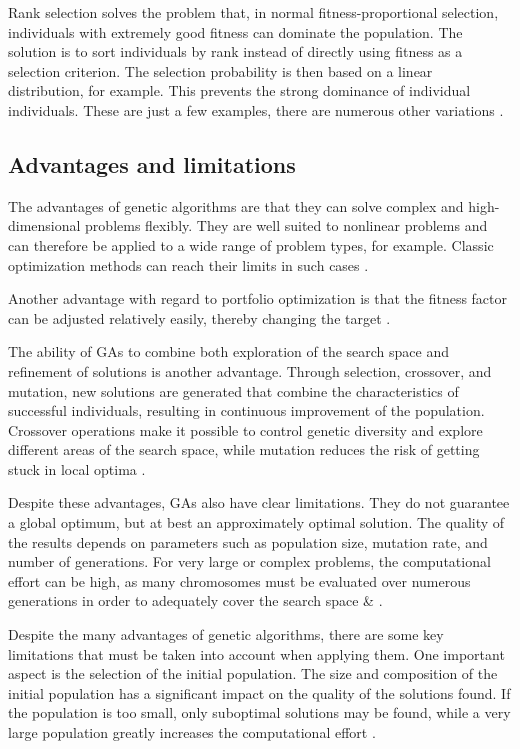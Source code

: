 \documentclass{agasthesis}
\begin{document}
Rank selection solves the problem that, in normal fitness-proportional selection, individuals with extremely good fitness can dominate the population. 
The solution is to sort individuals by rank instead of directly using fitness as a selection criterion. 
The selection probability is then based on a linear distribution, for example. This prevents the strong dominance of individual individuals. 
These are just a few examples, there are numerous other variations \cite[p. 126-128]{melanie_introduction_1999}.

\subsection{Advantages and limitations}
The advantages of genetic algorithms are that they can solve complex and high-dimensional problems flexibly. 
They are well suited to nonlinear problems and can therefore be applied to a wide range of problem types, for example. 
Classic optimization methods can reach their limits in such cases \cite{melanie_introduction_1999}. 

Another advantage with regard to portfolio optimization is that the fitness factor can be adjusted relatively easily, 
thereby changing the target \cite[p. 206-207]{soldatos_big_2022}. 

The ability of GAs to combine both exploration of the search space and refinement of solutions is another advantage. 
Through selection, crossover, and mutation, new solutions are generated that combine the characteristics of successful individuals, 
resulting in continuous improvement of the population. Crossover operations make it possible to control genetic diversity and explore different 
areas of the search space, while mutation reduces the risk of getting stuck in local optima \cite[p. 8097–8101]{katoch_review_2021}.

Despite these advantages, GAs also have clear limitations. They do not guarantee a global optimum, but at best an approximately optimal solution. 
The quality of the results depends on parameters such as population size, mutation rate, and number of generations. For very large or complex problems, 
the computational effort can be high, as many chromosomes must be evaluated over numerous generations in order to adequately cover the search space \cite[p. 88]{melanie_introduction_1999} & \cite{osman_introduction_1995}.

Despite the many advantages of genetic algorithms, there are some key limitations that must be taken into account when applying them. 
One important aspect is the selection of the initial population. The size and composition of the initial population has a significant 
impact on the quality of the solutions found. If the population is too small, only suboptimal solutions may be found, while a very large 
population greatly increases the computational effort \cite[p. 8114–8116]{katoch_review_2021}.
\end{document}
